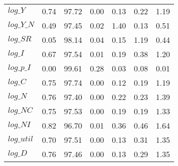 \begin{center}
\begin{longtable}{lcccccc}
$log\_Y     $	 & 	        0.74	 & 	       97.72	 & 	        0.00	 & 	        0.13	 & 	        0.22	 & 	        1.19 \\ 
$log\_Y\_N  $	 & 	        0.49	 & 	       97.45	 & 	        0.02	 & 	        1.40	 & 	        0.13	 & 	        0.51 \\ 
$log\_SR    $	 & 	        0.05	 & 	       98.14	 & 	        0.04	 & 	        0.15	 & 	        1.19	 & 	        0.44 \\ 
$log\_I     $	 & 	        0.67	 & 	       97.54	 & 	        0.01	 & 	        0.19	 & 	        0.38	 & 	        1.20 \\ 
$log\_p\_I  $	 & 	        0.00	 & 	       99.61	 & 	        0.28	 & 	        0.03	 & 	        0.08	 & 	        0.01 \\ 
$log\_C     $	 & 	        0.75	 & 	       97.74	 & 	        0.00	 & 	        0.12	 & 	        0.19	 & 	        1.19 \\ 
$log\_N     $	 & 	        0.76	 & 	       97.40	 & 	        0.00	 & 	        0.22	 & 	        0.23	 & 	        1.39 \\ 
$log\_NC    $	 & 	        0.75	 & 	       97.53	 & 	        0.00	 & 	        0.19	 & 	        0.19	 & 	        1.33 \\ 
$log\_NI    $	 & 	        0.82	 & 	       96.70	 & 	        0.01	 & 	        0.36	 & 	        0.46	 & 	        1.64 \\ 
$log\_util  $	 & 	        0.70	 & 	       97.51	 & 	        0.00	 & 	        0.13	 & 	        0.31	 & 	        1.35 \\ 
$log\_D     $	 & 	        0.76	 & 	       97.46	 & 	        0.00	 & 	        0.13	 & 	        0.29	 & 	        1.35 \\ 
\end{longtable}
 \end{center}
